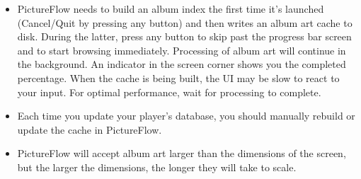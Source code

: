   \begin{itemize}
    \item PictureFlow needs to build an album index the first time it's launched
    (Cancel/Quit by pressing any button) and then writes an album art cache to disk.
    During the latter, press any button to skip past the progress bar screen and
    to start browsing immediately. Processing of album art will continue in the
    background. An indicator in the screen corner shows you the completed percentage.
    When the cache is being built, the UI may be slow to react to your input.
    For optimal performance, wait for processing to complete.
    \item Each time you update your player's database, you should manually rebuild or
    update the cache in PictureFlow.
    \item PictureFlow will accept album art larger than the dimensions of the
    screen, but the larger the dimensions, the longer they will take to scale.
  \end{itemize}

